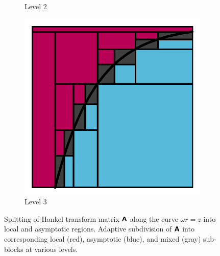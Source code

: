 \begin{figure}
\begin{subfigure}[b]{0.21\textwidth}
    \caption{Level 2}
  \end{subfigure}
  \hfill
  \begin{subfigure}[b]{0.21\textwidth}
    \includegraphics[width=\textwidth, trim={\tw, \tw, \tw, \tw}, clip]{./figures/splitting_lvl3.pdf}
    \caption{Level 3}
  \end{subfigure}
  \caption{Splitting of Hankel transform matrix $\bm{\mathsf{A}}$ along the curve
  $\omega r = z$ into local and asymptotic regions. Adaptive subdivision of
  $\bm{\mathsf{A}}$ into corresponding local (red), asymptotic (blue), and mixed (gray)
  sub-blocks at various levels.}
  \label{fig:subdivide}
\end{figure}
